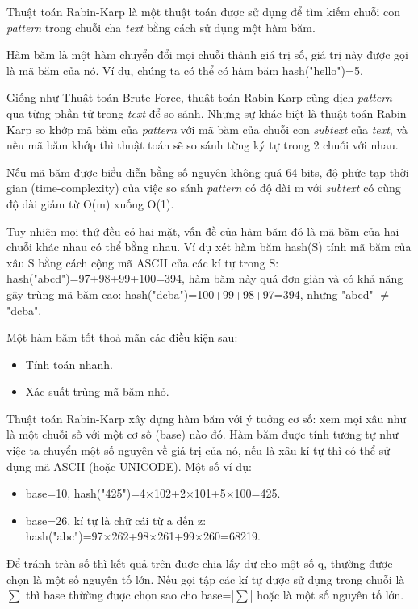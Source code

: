 \documentclass[a4paper,11pt]{article}
\begin{document}
			Thuật toán Rabin-Karp là một thuật toán được sử dụng để tìm kiếm
			chuỗi con \textit{pattern} trong chuỗi cha \textit{text} bằng cách sử dụng một hàm băm.

			Hàm băm là một hàm chuyển đổi mọi chuỗi thành giá trị số, giá trị này được gọi là mã băm của nó. Ví dụ, chúng ta có thể có hàm băm hash("hello")=5.

			Giống như Thuật toán Brute-Force, thuật toán Rabin-Karp cũng dịch \textit{pattern} 
			qua từng phần tử trong \textit{text} để so sánh.
			Nhưng sự khác biệt là thuật toán Rabin-Karp so khớp mã băm của \textit{pattern} 
			với mã băm của chuỗi con \textit{subtext} của \textit{text}, và nếu mã băm khớp thì thuật toán sẽ so sánh từng ký tự trong 2 chuỗi với nhau.

			Nếu mã băm được biểu diễn bằng số nguyên không quá 64 bits, độ phức tạp thời gian (time-complexity) 
			của việc so sánh \textit{pattern} có độ dài m với \textit{subtext} có cùng độ dài giảm từ O(m) xuống O(1).

			Tuy nhiên mọi thứ đều có hai mặt, vấn đề của hàm băm đó là mã băm của hai chuỗi khác nhau có thể bằng nhau. 
			Ví dụ xét hàm băm hash(S) tính mã băm của xâu S bằng cách cộng mã ASCII của các kí tự trong S: hash("abcd")=97+98+99+100=394, hàm băm này quá đơn giản và có khả năng gây trùng mã băm cao: hash("dcba")=100+99+98+97=394, nhưng "abcd" $\neq$ "dcba".

			Một hàm băm tốt thoả mãn các điều kiện sau:
			\begin{itemize}
				\item Tính toán nhanh.
				\item Xác suất trùng mã băm nhỏ.
			\end{itemize}

			Thuật toán Rabin-Karp xây dựng hàm băm với ý tuởng cơ số: xem mọi xâu như là một chuỗi số với một cơ số (base) nào đó. Hàm băm đuợc tính tương tự như việc ta chuyển một số nguyên về giá trị của nó, nếu là xâu kí tự thì có thể sử dụng mã ASCII (hoặc UNICODE). Một số ví dụ:
			\begin{itemize}
			\item base=10, hash("425")=4×102+2×101+5×100=425.
			\item base=26, kí tự là chữ cái từ a đến z: hash("abc")=97×262+98×261+99×260=68219.
			\end{itemize}
			Để tránh tràn số thì kết quả trên đuợc chia lấy dư cho một số q, thường được chọn là một số nguyên tố lớn. Nếu gọi tập các kí tự được sử dụng trong chuỗi là $\sum$ thì base thừờng được chọn sao cho base=|$\sum$| hoặc là một số nguyên tố lớn.
\end{document}
